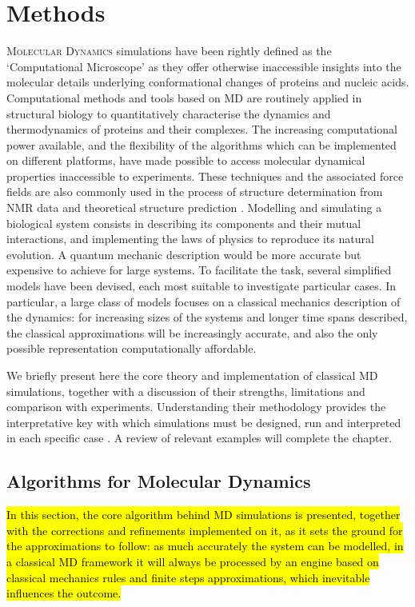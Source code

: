 \chapter{Methods} \label{chapter:MD}

\lettrine{M}{olecular Dynamics} simulations have been rightly defined as the `Computational Microscope' \cite{Lee2009,Dror2012} as they offer otherwise inaccessible insights into the molecular details underlying conformational changes of proteins and nucleic acids. Computational methods and tools based on MD are routinely applied in structural biology to quantitatively characterise the dynamics and thermodynamics of proteins and their complexes. The increasing computational power available, and the flexibility of the algorithms which can be implemented on different platforms, have made possible to access molecular dynamical properties inaccessible to experiments. These techniques and the associated force fields are also commonly used in the process of structure determination from NMR data and theoretical structure prediction \cite{Vogel2017,Heo2018}.
%
Modelling and simulating a biological system consists in describing its components and their mutual interactions, and implementing the laws of physics to reproduce its natural evolution. A quantum mechanic description would be more accurate but expensive to achieve for large systems. To facilitate the task, several simplified models have been devised, each most suitable to investigate particular cases.
%
In particular, a large class of models focuses on a classical mechanics description of the dynamics: for increasing sizes of the systems and longer time spans described, the classical approximations will be increasingly accurate, and also the only possible representation computationally affordable.

We briefly present here the core theory and implementation of classical MD simulations, together with a discussion of their strengths, limitations and comparison with experiments. Understanding their methodology provides the interpretative key with which simulations must be designed, run and interpreted in each specific case \cite{vanGunsteren2006}. A review of relevant examples will complete the chapter.


\section{Algorithms for Molecular Dynamics}

\hl{In this section, the core algorithm behind MD simulations is presented, together with the corrections and refinements implemented on it, as it sets the ground for the approximations to follow: as much accurately the system can be modelled, in a classical MD framework it will always be processed by an engine based on classical mechanics rules and finite steps approximations, which inevitable influences the outcome.}

